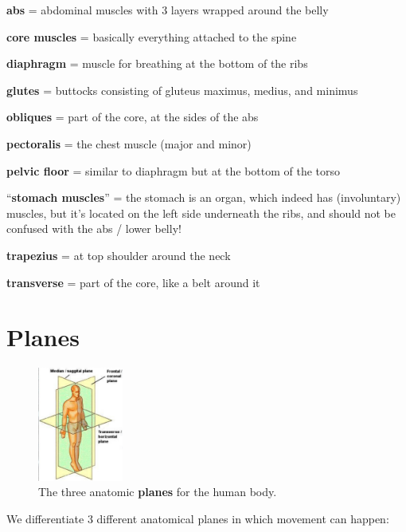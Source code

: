 \begin{itemize*}
    \item \textbf{abs} = abdominal muscles with 3 layers wrapped around the belly
    \item \textbf{core muscles} = basically everything attached to the spine
    \item \textbf{diaphragm} = muscle for breathing at the bottom of the ribs
    \item \textbf{glutes} = buttocks consisting of gluteus maximus, medius, and minimus
    \item \textbf{obliques} = part of the core, at the sides of the abs
    \item \textbf{pectoralis} = the chest muscle (major and minor)
    \item \textbf{pelvic floor} = similar to diaphragm but at the bottom of the torso
    \item ``\textbf{stomach muscles}'' = the stomach is an organ, which indeed has (involuntary) muscles, but it's located on the left side underneath the ribs, and should not be confused with the abs / lower belly!
    \item \textbf{trapezius} = at top shoulder around the neck
    \item \textbf{transverse} = part of the core, like a belt around it
\end{itemize*}

\section{Planes}\label{sec:planes}

\begin{figure}
    \centering
    \includegraphics[width=0.25\textwidth]{images/anatomy_planes}
    \caption{The three anatomic \textbf{planes} for the human body.}
\end{figure}

We differentiate 3 different anatomical planes in which movement can happen:

